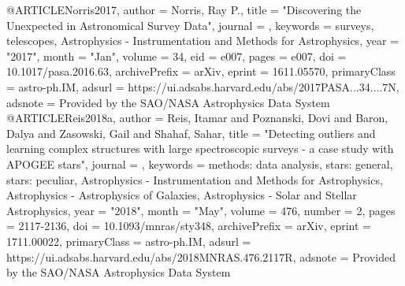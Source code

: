 @ARTICLE{Norris2017,
       author = {{Norris}, Ray P.},
        title = "{Discovering the Unexpected in Astronomical Survey Data}",
      journal = {\pasa},
     keywords = {surveys, telescopes, Astrophysics - Instrumentation and Methods for Astrophysics},
         year = "2017",
        month = "Jan",
       volume = {34},
          eid = {e007},
        pages = {e007},
          doi = {10.1017/pasa.2016.63},
archivePrefix = {arXiv},
       eprint = {1611.05570},
 primaryClass = {astro-ph.IM},
       adsurl = {https://ui.adsabs.harvard.edu/abs/2017PASA...34....7N},
      adsnote = {Provided by the SAO/NASA Astrophysics Data System}
}
@ARTICLE{Reis2018a,
       author = {{Reis}, Itamar and {Poznanski}, Dovi and {Baron}, Dalya and
         {Zasowski}, Gail and {Shahaf}, Sahar},
        title = "{Detecting outliers and learning complex structures with large spectroscopic surveys - a case study with APOGEE stars}",
      journal = {\mnras},
     keywords = {methods: data analysis, stars: general, stars: peculiar, Astrophysics - Instrumentation and Methods for Astrophysics, Astrophysics - Astrophysics of Galaxies, Astrophysics - Solar and Stellar Astrophysics},
         year = "2018",
        month = "May",
       volume = {476},
       number = {2},
        pages = {2117-2136},
          doi = {10.1093/mnras/sty348},
archivePrefix = {arXiv},
       eprint = {1711.00022},
 primaryClass = {astro-ph.IM},
       adsurl = {https://ui.adsabs.harvard.edu/abs/2018MNRAS.476.2117R},
      adsnote = {Provided by the SAO/NASA Astrophysics Data System}
}

